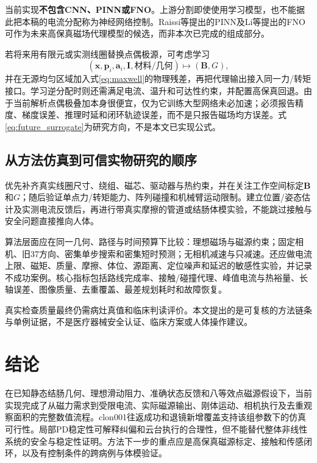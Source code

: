 \documentclass[UTF8,a4paper,zihao=5,fontset=windows]{ctexart}
\newcommand{\vect}[1]{\bm{#1}}
\begin{document}
当前实现\textbf{不包含CNN、PINN或FNO}。上游分割即使使用学习模型，也不能据此把本稿的电流分配称为神经网络控制。Raissi等提出的PINN\cite{raissi2019}及Li等提出的FNO\cite{li2021}可作为未来高保真磁场代理模型的候选，而非本次已完成的组成部分。

若将来用有限元或实测线圈替换点偶极源，可考虑学习
\begin{equation}
(\vect x,\vect p_i,\vect a_i,\vect I,\text{材料/几何})\longmapsto(\vect B,G),
\label{eq:future_surrogate}
\end{equation}
并在无源均匀区域加入式\eqref{eq:maxwell}的物理残差，再把代理输出接入同一力/转矩接口。学习逆分配时则还需满足电流、温升和可达性约束，并配置高保真回退。由于当前解析点偶极叠加本身很便宜，仅为它训练大型网络未必加速；必须报告精度、梯度误差、推理时延和闭环轨迹误差，而不是只报告磁场均方误差。式\eqref{eq:future_surrogate}为研究方向，不是本文已实现公式。

\subsection{从方法仿真到可信实物研究的顺序}
优先补齐真实线圈尺寸、绕组、磁芯、驱动器与热约束，并在关注工作空间标定$\vect B$和$G$；随后验证单点力/转矩能力、阵列碰撞和机械臂运动限制。建立位置/姿态估计及实测电流反馈后，再进行带真实摩擦的管道或结肠体模实验，不能跳过接触与安全问题直接推向人体。

算法层面应在同一几何、路径与时间预算下比较：理想磁场与磁源约束；固定相机、旧37方向、密集单步搜索和密集短时预测；无相机减速与只减速。还应做电流上限、磁矩、质量、摩擦、体位、源距离、定位噪声和延迟的敏感性实验，并记录不成功案例。核心指标包括路线完成率、接触/碰撞代理、峰值电流与热裕量、长轴误差、图像质量、去重覆盖、最差规划耗时和故障恢复。

真实检查质量最终仍需病灶真值和临床判读评价。本文提出的是可复核的方法链条与单例证据，不是医疗器械安全认证、临床方案或人体操作建议。

\section{结论}
在已知静态结肠几何、理想滑动阻力、准确状态反馈和八等效点磁源假设下，当前实现完成了从磁力需求到受限电流、实际磁源输出、刚体运动、相机执行及去重观察面积的完整数值流程。clon001往返成功和退镜新增覆盖支持该组参数下的仿真可行性。局部PD稳定性可解释纠偏和云台执行的合理性，但不能替代整体非线性系统的安全与稳定性证明。方法下一步的重点应是高保真磁源标定、接触和传感闭环，以及有控制条件的跨病例与体模验证。
\clearpage\appendix
\end{document}

